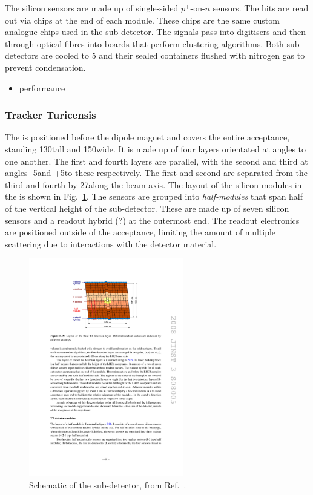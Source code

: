 The silicon sensors are made up of single-sided $p^{+}$-on-$n$ sensors. The hits are read out via chips at the end of each module. These chips are the same custom analogue chips used in the \velo sub-detector. The signals pass into digitisers and then through optical fibres into \tellone boards that perform clustering algorithms.
Both sub-detectors are cooled to 5 and their sealed containers flushed with nitrogen gas to prevent condensation.


{\color{Red}
\begin{itemize}
\item performance
\end{itemize}
}


\subsubsection{Tracker Turicensis}

The \ttracker is positioned before the dipole magnet and covers the entire \lhcb acceptance, standing 130\cm tall and 150\cm wide.
It is made up of four layers orientated at angles to one another. The first and fourth layers are parallel, with the second and third at angles -5\degrees and +5\degrees to these respectively. The first and second are separated from the third and fourth by 27\cm along the beam axis. The layout of the silicon modules in the \ttracker is shown in Fig.~\ref{fig:Dec_tt_layout}. The sensors are grouped into \emph{half-modules} that span half of the vertical height of the sub-detector. These are made up of seven silicon sensors and a readout hybrid (?) at the outermost end. The readout electronics are positioned outside of the \lhcb acceptance, limiting the amount of multiple scattering due to interactions with the detector material. 

\begin{figure}[!h]
    \centering
    \includegraphics[width=0.6\textwidth]{figs/Detector/tt_layout.pdf}
    \caption{Schematic of the \ttracker sub-detector, from Ref.~\cite{Alves:2008zz}.}
    \label{fig:Dec_tt_layout}   
\end{figure}

